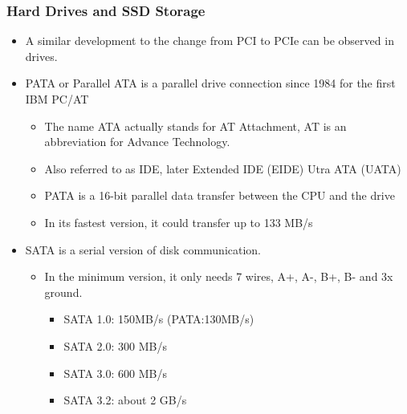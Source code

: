 \documentclass{beamer}
\begin{document}
\begin{frame}
\frametitle{Hard Drives and SSD Storage}

\begin{itemize}
\item A similar development to the change from PCI to PCIe can be observed in drives.
\item PATA or Parallel ATA is a parallel drive connection since 1984 for the first IBM PC/AT
\begin{itemize}
\item The name ATA actually stands for AT Attachment, AT is an abbreviation for Advance Technology.
\item Also referred to as IDE, later Extended IDE (EIDE) Utra ATA (UATA)
\item PATA is a 16-bit parallel data transfer between the CPU and the drive
\item In its fastest version, it could transfer up to 133 MB/s
\end{itemize}
\item SATA is a serial version of disk communication.
\begin{itemize}
\item In the minimum version, it only needs 7 wires, A+, A-, B+, B- and 3x ground.
\begin{itemize}
\item SATA 1.0: 150MB/s (PATA:130MB/s)
\item SATA 2.0: 300 MB/s
\item SATA 3.0: 600 MB/s
\item SATA 3.2: about 2 GB/s
\end{itemize}
\end{itemize}
\end{itemize}
\end{frame}
\end{document}
